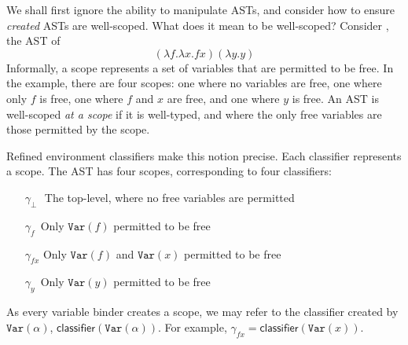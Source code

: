 We shall first ignore the ability to manipulate ASTs, and consider how to ensure \textit{created} ASTs are well-scoped. What does it mean to be well-scoped? Consider , the AST of 
\[(\lambda f. \lambda x. f x) (\lambda y. y)\]
Informally, a scope represents a set of variables that are permitted to be free. In the example, there are four scopes: one where no variables are free, one where only $f$ is free, one where $f$ and $x$ are free, and one where $y$ is free. An AST is well-scoped \textit{at a scope} if it is well-typed, and where the only free variables are those permitted by the scope. 

Refined environment classifiers make this notion precise. Each classifier represents a scope. The AST has four scopes, corresponding to four classifiers:
\begin{itemize}
\item[$\gamma_{\bot}$\,\,] The top-level, where no free variables are permitted 
\item[$\gamma_{f}$\;\,] Only $\texttt{Var}(f)$ permitted to be free
\item[$\gamma_{fx}$] Only $\texttt{Var}(f)$ and $\texttt{Var}(x)$ permitted to be free 
\item[$\gamma_{y}$\;\,] Only $\texttt{Var}(y)$ permitted to be free
\end{itemize}
As every variable binder creates a scope, we may refer to the classifier created by $\texttt{Var}(\alpha)$, $\textsf{classifier}(\texttt{Var}(\alpha))$. For example, $\gamma_{fx}= \textsf{classifier}(\texttt{Var}(x))$.

